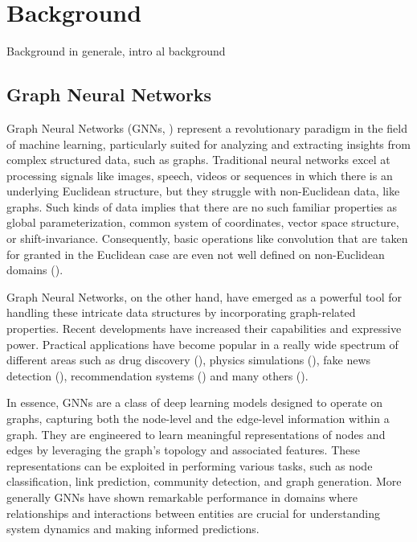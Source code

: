 \documentclass[binding=0.6cm]{sapthesis}
\newcommand{\mycite}[1]{(\cite{#1})}
\begin{document}
\chapter{Background}
\label{chap:2-background}
Background in generale, intro al background

\section{Graph Neural Networks}
\label{sec:bg.gnn}
Graph Neural Networks (GNNs, \cite{gnnModel2009}) represent a revolutionary paradigm in the field of machine learning, particularly suited for analyzing and extracting insights from complex structured data, such as graphs. Traditional neural networks excel at processing signals like images, speech, videos or sequences in which there is an underlying Euclidean structure, but they struggle with non-Euclidean data, like graphs. Such kinds of data implies that there are no such familiar properties as global parameterization, common system of coordinates, vector space structure, or shift-invariance. Consequently, basic operations like convolution that are taken for granted in the Euclidean case are even not well defined on non-Euclidean domains \mycite{Bronstein_2017}. 

Graph Neural Networks, on the other hand, have emerged as a powerful tool for handling these intricate data structures by incorporating graph-related properties. Recent developments have increased their capabilities and expressive power. Practical applications have become popular in a really wide spectrum of different areas such as drug discovery \mycite{doi:10.1021/acs.jmedchem.9b00959}, physics simulations \mycite{sanchezgonzalez2020learning}, fake news detection \mycite{monti2019fake}, recommendation systems \mycite{eksombatchai2017pixie} and many others \mycite{hamilton2020graph}.

In essence, GNNs are a class of deep learning models designed to operate on graphs, capturing both the node-level and the edge-level information within a graph. They are engineered to learn meaningful representations of nodes and edges by leveraging the graph's topology and associated features. These representations can be exploited in performing various tasks, such as node classification, link prediction, community detection, and graph generation. More generally GNNs have shown remarkable performance in domains where relationships and interactions between entities are crucial for understanding system dynamics and making informed predictions.
\end{document}
